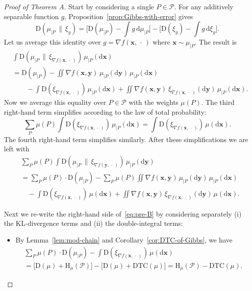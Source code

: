 \documentclass[aop,preprint]{imsart}
\theoremstyle{remark}
\renewcommand{\bf}[1]{\boldsymbol{#1}}
\renewcommand{\cal}[1]{\mathcal{#1}}
\newcommand{\rmH}{\mathrm{H}}
\renewcommand{\d}{\mathrm{d}}
\renewcommand{\P}{\mathcal{P}}
\newcommand{\DTC}{\mathrm{DTC}}
\newcommand{\rmD}{\mathrm{D}}
\begin{document}
\begin{proof}[Proof of Theorem A]
Start by considering a single $P\in \P$.  For any additively separable function $g$, Proposition~\ref{prop:Gibbs-with-error} gives
\[	\rmD(\mu_{|P}\,\|\,\xi_g) = \Big[\rmD(\mu_{|P}) - \int g\,\d\mu_{|P}\Big] - \Big[\rmD(\xi_g) - \int g\,\d\xi_g\Big].\]
Let us average this identity over $g = \nabla f(\bf{x},\,\cdot\,)$ where $\bf{x}\sim \mu_{|P}$.  The result is
\begin{align*}
	&\int \rmD(\mu_{|P}\,\|\,\xi_{\nabla f(\bf{x},\,\cdot\,)})\,\mu_{|P}(\d \bf{x}) \nonumber \\
	&=\rmD(\mu_{|P}) - \iint \nabla f(\bf{x},\bf{y})\ \mu_{|P}(\d \bf{y})\,\mu_{|P}(\d \bf{x}) \\
	&\qquad -\int\rmD(\xi_{\nabla f(\bf{x},\,\cdot\,)})\,\mu_{|P}(\d \bf{x}) + \iint \nabla f(\bf{x},\bf{y})\ \xi_{\nabla f(\bf{x},\,\cdot\,)}(\d\bf{y})\,\mu_{|P}(\d \bf{x}).
\end{align*}
Now we average this equality over $P \in \cal{P}$ with the weights $\mu(P)$.  The third right-hand term simplifies according to the law of total probability:
\[\sum_P\mu(P)\int\rmD(\xi_{\nabla f(\bf{x},\,\cdot\,)})\,\mu_{|P}(\d \bf{x}) = \int\rmD(\xi_{\nabla f(\bf{x},\,\cdot\,)})\,\mu(\d \bf{x}).\]
The fourth right-hand term simplifies similarly. After these simplifications we are left with
	\begin{align}\label{eq:pre-B}
	&\sum_P\mu(P)\int \rmD(\mu_{|P}\,\|\,\xi_{\nabla f(\bf{y},\,\cdot\,)})\,\mu_{|P}(\d\bf{y}) \nonumber \\
	&= \sum_P\mu(P)\cdot\rmD(\mu_{|P}) - \sum_P\mu(P)\iint \nabla f(\bf{x},\bf{y})\,\mu_{|P}(\d\bf{y})\,\mu_{|P}(\d\bf{x}) \nonumber\\
	&\quad -\int \rmD(\xi_{\nabla f(\bf{x},\,\cdot\,)})\,\mu(\d\bf{x}) + \iint \nabla f(\bf{x},\bf{y})\,\xi_{\nabla f(\bf{x},\,\cdot\,)}(\d \bf{y})\,\mu(\d\bf{x}).
\end{align}

Next we re-write the right-hand side of~\eqref{eq:pre-B} by considering separately (i) the KL-divergence terms and (ii) the double-integral terms:
\begin{itemize}
\item[(i)] By Lemma~\ref{lem:mod-chain} and Corollary~\ref{cor:DTC-of-Gibbs}, we have
\begin{multline*}
\sum_P\mu(P)\cdot\rmD(\mu_{|P}) - \int \rmD(\xi_{\nabla f(\bf{x},\,\cdot\,)})\,\mu(\d\bf{x})\\ = \big[\rmD(\mu) + \rmH_\mu(\P)\big] - \big[\rmD(\mu) + \DTC(\mu)\big] = \rmH_\mu(\P) - \DTC(\mu).
\end{multline*}


\end{itemize}
\end{proof}
\end{document}
